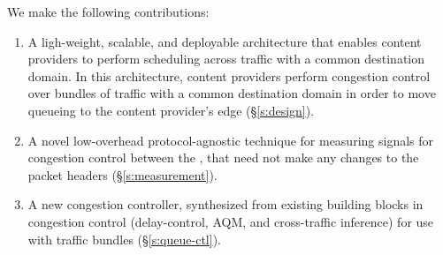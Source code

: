 We make the following contributions:
\begin{enumerate}
    \item A ligh-weight, scalable, and deployable architecture that enables content providers to perform scheduling across traffic with a common destination domain. In this architecture, content providers perform congestion control over bundles of traffic with a common destination domain in order to move queueing to the content provider's edge (\S\ref{s:design}).
     \item A novel low-overhead protocol-agnostic technique for measuring signals for congestion control between the \pair, that need not make any changes to the packet headers (\S\ref{s:measurement}).
     \item A new congestion controller, synthesized from existing building blocks in congestion control (delay-control, AQM, and cross-traffic inference) for use with traffic bundles (\S\ref{s:queue-ctl}).
\end{enumerate}
